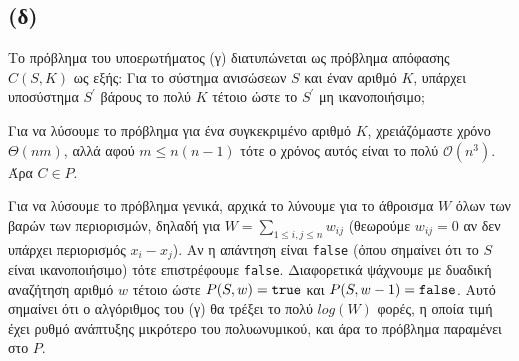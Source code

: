 \documentclass[a4paper,11pt]{article}
\begin{document}
\subsection*{(δ)}
Το πρόβλημα του υποερωτήματος (γ) διατυπώνεται ως πρόβλημα απόφασης $C(S,K)$ ως εξής:
Για το σύστημα ανισώσεων $S$ και έναν αριθμό $Κ$, υπάρχει υποσύστημα $S^\prime$ βάρους το πολύ $K$ τέτοιο ώστε το $S^\prime$ μη ικανοποιήσιμο;

Για να λύσουμε το πρόβλημα για ένα συγκεκριμένο αριθμό $K$, χρειάζόμαστε χρόνο $\Theta(nm)$, αλλά αφού $m\leq n(n-1)$ τότε ο χρόνος αυτός είναι το πολύ $\mathcal{O}(n^3)$. Άρα $C \in P$.

Για να λύσουμε το πρόβλημα γενικά, αρχικά το λύνουμε για το άθροισμα $W$ όλων των βαρών των περιορισμών, δηλαδή για $W = \sum_{1 \leq i,j \leq n} w_{ij}$ (θεωρούμε $w_{ij}=0$ αν δεν υπάρχει περιορισμός $x_i-x_j$).
Αν η απάντηση είναι \verb|false| (όπου σημαίνει ότι το $S$ είναι ικανοποιήσιμο) τότε επιστρέφουμε \verb|false|.
Διαφορετικά ψάχνουμε με δυαδική αναζήτηση αριθμό $w$ τέτοιο ώστε $P(S,w) = \verb|true|$ και $P(S,w-1) = \verb|false|$.
Αυτό σημαίνει ότι ο αλγόριθμος του (γ) θα τρέξει το πολύ $log(W)$ φορές, η οποία τιμή έχει ρυθμό ανάπτυξης μικρότερο του πολυωνυμικού, και άρα το πρόβλημα παραμένει στο $P$.
\end{document}
